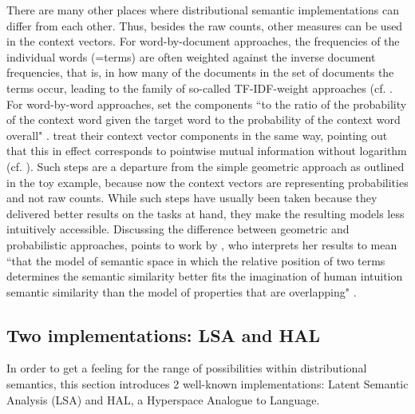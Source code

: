 There are many other places where distributional semantic
implementations can differ from each other.
Thus, besides the raw counts, other measures can be used in the context
vectors. For word-by-document approaches, the frequencies of the
individual words (=terms) are often weighted against the inverse
document frequencies, that is, in how many of the documents in the set
of documents the terms occur, leading to the family of so-called TF-IDF-weight
approaches (cf. \citealt{SaltonandYang:1973}. 
For word-by-word approaches, \citet{MitchellandLapata:2008} set the components ``to the
ratio of the probability of the context word given the target word to
the probability of the context word overall"
\citep[241]{MitchellandLapata:2008}. 
\citet{Reddyetal:2011} treat
their context vector components in the same way, pointing out that
this in effect corresponds to pointwise mutual information without
logarithm (cf. \citealt[215, Footnote 4]{Reddyetal:2011}).  
Such steps are a departure from the simple geometric approach as
outlined in the toy example, because now the context vectors are
representing probabilities and not raw counts. While such steps have usually been taken
because they delivered better results on the tasks at hand, they make
the resulting models less intuitively
accessible. Discussing the difference
between geometric and probabilistic approaches, \citet[28]{Sahlgren:2006} points to work by
\citet{Ruge:1992}, who interprets her results to mean ``that the model
of semantic space in which the relative position of two terms
determines the semantic similarity better fits the imagination of
human intuition semantic similarity than the model of properties that
are overlapping" \citep[328--329]{Ruge:1992}. 


\subsection{Two implementations: LSA and HAL}
\label{sec:ds-well-known}

In
order to get a feeling for the range of possibilities within
distributional semantics, this section introduces 2 well-known
implementations: Latent Semantic Analysis (LSA) and  HAL, a
Hyperspace Analogue to Language.

